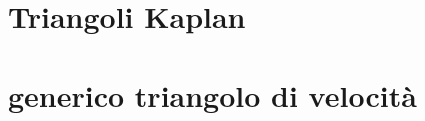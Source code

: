 \documentclass[a4paper, 15pt]{article}
\begin{document}
\section{Triangoli Kaplan}
%		
%		


\section{generico triangolo di velocità}

\end{document}

